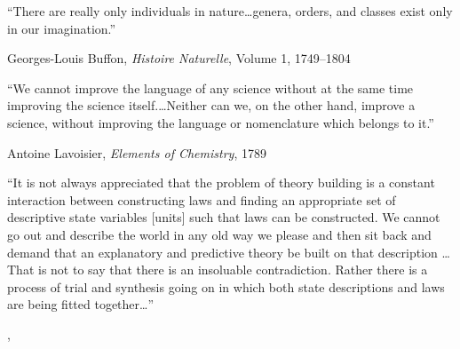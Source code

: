 

\setcounter{page}{0} %
\newpage
\thispagestyle{empty}

\renewcommand{\epigraphflush}{center} %
\renewcommand{\epigraphsize}{\large} %
\renewcommand{\textflush}{center} %
\setlength{\epigraphwidth}{0.7\textwidth} %



\epigraph{\vspace{1cm}``There are really only individuals in nature\ldots genera, orders, and classes exist only in our imagination.''}{Georges-Louis Buffon, \emph{Histoire Naturelle}, Volume 1, 1749--1804}


\epigraph{\vspace{1cm}``We cannot improve the language of any science without at the same time improving the science itself.\ldots Neither can we, on the other hand, improve a science, without improving the language or nomenclature which belongs to it.''}{Antoine Lavoisier, \emph{Elements of Chemistry}, 1789}



\epigraph{\vspace{1cm}``It is not always appreciated that the problem of theory building is a constant interaction between constructing laws and finding an appropriate set of descriptive state variables [units] such that laws can be constructed.  We cannot go out and describe the world in any old way we please and then sit back and demand that an explanatory and predictive theory be built on that description \ldots That is not to say that there is an insoluable contradiction. Rather there is a process of trial and synthesis going on in which both state descriptions and laws are being fitted together\ldots''}{\Lewontin, \citeyearpar{Lewontin1974}}




\renewcommand{\epigraphflush}{flushright}
\renewcommand{\epigraphsize}{\small}
\setlength{\epigraphwidth}{0.4\textwidth}
\renewcommand{\textflush}{flushleft}